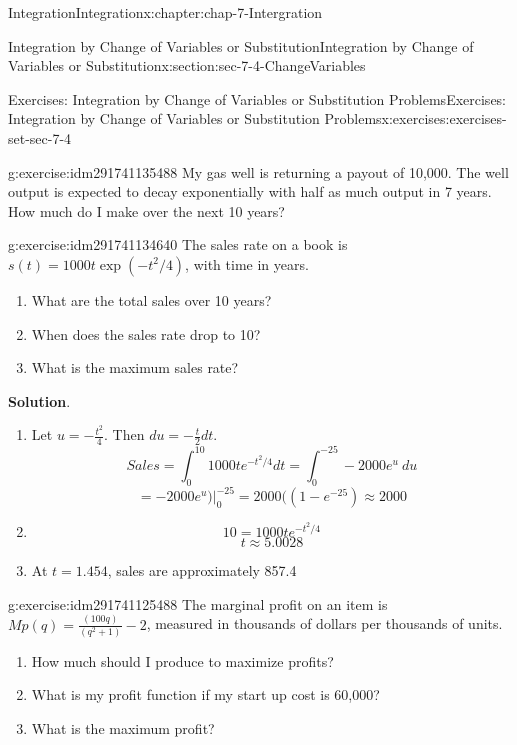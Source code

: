 \documentclass[oneside,10pt,]{book}
\numberwithin{equation}{section}
\begin{document}
\begin{chapterptx}{Integration}{}{Integration}{}{}{x:chapter:chap-7-Intergration}
\begin{sectionptx}{Integration by Change of Variables or Substitution}{}{Integration by Change of Variables or Substitution}{}{}{x:section:sec-7-4-ChangeVariables}
\begin{exercises-subsection}{Exercises: Integration by Change of Variables or Substitution Problems}{}{Exercises: Integration by Change of Variables or Substitution Problems}{}{}{x:exercises:exercises-set-sec-7-4}
\begin{divisionexercise}{22}{}{}{g:exercise:idm291741135488}
My gas well is returning a payout of  \textdollar{}10,000.  The well output is expected to decay exponentially with half as much output in 7 years.  How much do I make over the next 10 years?%
\end{divisionexercise}%
\begin{divisionexercise}{23}{}{}{g:exercise:idm291741134640}%
The sales rate on a book is \(s(t)=1000t \exp(-t^2/4)\), with time in years.%
%
\begin{enumerate}[label=(\alph*)]
\item{}What are the total sales over 10 years?%
\item{}When does the sales rate drop to 10?%
\item{}What is the maximum sales rate?%
\end{enumerate}
\par\smallskip%
\noindent\textbf{Solution}.\hypertarget{g:solution:idm291741131136}{}\quad{}%
\begin{enumerate}[label=(\alph*)]
\item{}Let \(u=-\frac{t^2}{4}\).  Then \(du=-\frac{t}{2} dt\).%
%
\begin{equation*}
Sales=\int_0^{10} 1000t e^{-t^2/4}dt=\int_0^{-25}-2000 e^u\ du
\end{equation*}
%
\begin{equation*}
=\left.-2000e^u)\right|_0^{-25}
=2000((1-e^{-25})\approx 2000
\end{equation*}
\item{}%
\begin{equation*}
10=1000t e^{-t^2/4}
\end{equation*}
%
\begin{equation*}
t\approx 5.0028
\end{equation*}
%
\item{}At \(t=1.454\), sales are approximately 857.4%
\end{enumerate}
\end{divisionexercise}%
\begin{divisionexercise}{24}{}{}{g:exercise:idm291741125488}%
The marginal profit on an item is \(Mp(q)=\frac{(100q)}{(q^2+1)}-2\), measured in thousands of dollars per thousands of units.%
%
\begin{enumerate}[label=(\alph*)]
\item{}How much should I produce to maximize profits?%
\item{}What is my profit function if my start up cost is \textdollar{}60,000?%
\item{}What is the maximum profit?%

\end{enumerate}
\end{divisionexercise}
\end{exercises-subsection}
\end{sectionptx}
\end{chapterptx}
\end{document}
